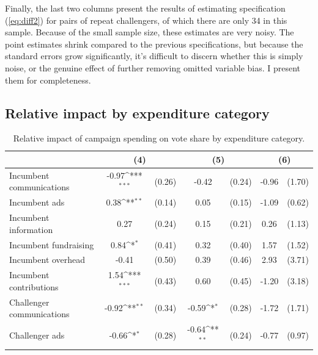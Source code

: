 \documentclass{article}
\begin{document}
Finally, the last two columns present the results of estimating specification (\ref{eq:diff2}) for pairs of repeat challengers, of which there are only 34 in this sample. Because of the small sample size, these estimates are very noisy. The point estimates shrink compared to the previous specifications, but because the standard errors grow significantly, it's difficult to discern whether this is simply noise, or the genuine effect of further removing omitted variable bias. I present them for completeness. 

\subsection{Relative impact by expenditure category}

\begin{table}
\centering
\def\sym#1{\ifmmode^{#1}\else\(^{#1}\)\fi}
\caption{Relative impact of campaign spending on vote share by expenditure category. \label{table:breakdown}}
\begin{tabular}{l*{3}{cc}}
\toprule
                    &\multicolumn{2}{c}{(4)}           &\multicolumn{2}{c}{(5)}           &\multicolumn{2}{c}{(6)}      \\
\midrule
Incumbent communications&       -0.97\sym{***}&      (0.26)&       -0.42         &      (0.24)&       -0.96         &      (1.70)\\
Incumbent ads       &        0.38\sym{**} &      (0.14)&        0.05         &      (0.15)&       -1.09         &      (0.62)\\
Incumbent information&        0.27         &      (0.24)&        0.15         &      (0.21)&        0.26         &      (1.13)\\
Incumbent fundraising&        0.84\sym{*}  &      (0.41)&        0.32         &      (0.40)&        1.57         &      (1.52)\\
Incumbent overhead  &       -0.41         &      (0.50)&        0.39         &      (0.46)&        2.93         &      (3.71)\\
Incumbent contributions&        1.54\sym{***}&      (0.43)&        0.60         &      (0.45)&       -1.20         &      (3.18)\\ \midrule
Challenger communications&       -0.92\sym{**} &      (0.34)&       -0.59\sym{*}  &      (0.28)&       -1.72         &      (1.71)\\
Challenger ads      &       -0.66\sym{*}  &      (0.28)&       -0.64\sym{**} &      (0.24)&       -0.77         &      (0.97)\\

\end{tabular}
\end{table}
\end{document}
